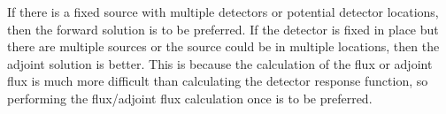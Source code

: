 \documentclass{article}
\begin{document}
If there is a fixed source with multiple detectors or potential detector locations, then the forward solution is to be preferred. If the detector is fixed in place but there are multiple sources or the source could be in multiple locations, then the adjoint solution is better. This is because the calculation of the flux or adjoint flux is much more difficult than calculating the detector response function, so performing the flux/adjoint flux calculation once is to be preferred.
\end{document}

